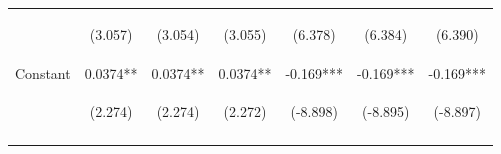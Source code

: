 \documentclass[]{article}
\begin{document}
\begin{center}
\begin{tabular}{lcccccc}
        \vspace{4pt}     & \begin{footnotesize}(3.057)\end{footnotesize}  & \begin{footnotesize}(3.054)\end{footnotesize}  & \begin{footnotesize}(3.055)\end{footnotesize}  & \begin{footnotesize}(6.378)\end{footnotesize}   & \begin{footnotesize}(6.384)\end{footnotesize}  & \begin{footnotesize}(6.390)\end{footnotesize}  \\
        Constant         & 0.0374**                                       & 0.0374**                                       & 0.0374**                                       & -0.169***                                       & -0.169***                                      & -0.169***                                      \\
                         & \begin{footnotesize}(2.274)\end{footnotesize}  & \begin{footnotesize}(2.274)\end{footnotesize}  & \begin{footnotesize}(2.272)\end{footnotesize}  & \begin{footnotesize}(-8.898)\end{footnotesize}  & \begin{footnotesize}(-8.895)\end{footnotesize} & \begin{footnotesize}(-8.897)\end{footnotesize} \\
        \vspace{4pt}     & \begin{footnotesize}\end{footnotesize}         & \begin{footnotesize}\end{footnotesize}         & \begin{footnotesize}\end{footnotesize}         & \begin{footnotesize}\end{footnotesize}          & \begin{footnotesize}\end{footnotesize}         & \begin{footnotesize}\end{footnotesize}         \\

\end{tabular}
\end{center}
\end{document}
